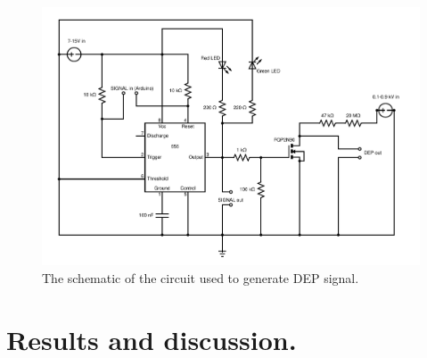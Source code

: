 \documentclass[final]{jyflluk}
\begin{document}
\begin{figure}[ht]
    \centering
    \includegraphics[width=1.0\textwidth]{images/circuit.pdf}
    \caption{The schematic of the circuit used to generate DEP signal.}
    \label{fig:circuit}
\end{figure}

\section{Results and discussion.}
\label{sec:results}
\end{document}
